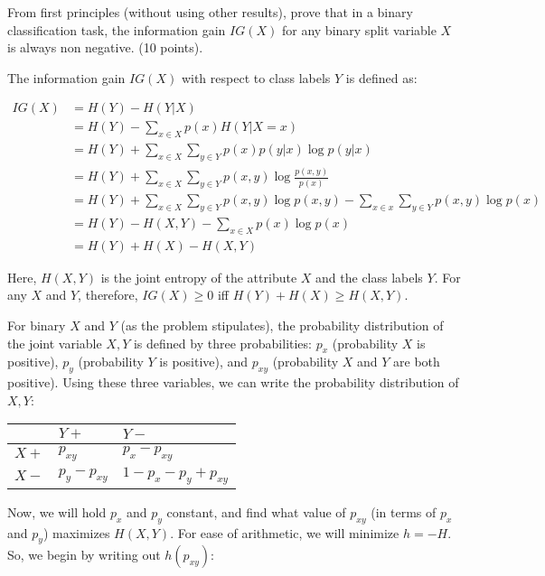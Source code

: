 \documentclass[fleqn]{homework}
\begin{document}
  \begin{problem}{3}
    \begin{question}
      From first principles (without using other results), prove that in a
      binary classification task, the information gain $IG(X)$ for any binary
      split variable $X$ is always non negative. (10 points).
    \end{question}

    The information gain $IG(X)$ with respect to class labels $Y$ is defined as:

    \begin{align*}
      IG(X) &= H(Y) - H(Y|X) \\
            &= H(Y) - \sum_{x \in X} p(x) H(Y|X=x) \\
            &= H(Y) + \sum_{x \in X} \sum_{y \in Y} p(x) p(y|x) \log p(y|x) \\
            &= H(Y) + \sum_{x \in X} \sum_{y \in Y} p(x, y) \log \frac{p(x,y)}{p(x)} \\
            &= H(Y) + \sum_{x \in X} \sum_{y \in Y} p(x, y) \log p(x,y) - \sum_{x \in x} \sum_{y \in Y} p(x,y) \log p(x) \\
            &= H(Y) - H(X,Y) - \sum_{x \in X} p(x) \log p(x) \\
            &= H(Y) + H(X) - H(X,Y)
    \end{align*}

    Here, $H(X,Y)$ is the joint entropy of the attribute $X$ and the class
    labels $Y$.  For any $X$ and $Y$, therefore, $IG(X) \ge 0$ iff
    $H(Y) + H(X) \ge H(X,Y)$.

    For binary $X$ and $Y$ (as the problem stipulates), the probability
    distribution of the joint variable $X,Y$ is defined by three probabilities:
    $p_x$ (probability $X$ is positive), $p_y$ (probability $Y$ is positive),
    and $p_{xy}$ (probability $X$ and $Y$ are both positive).  Using these three
    variables, we can write the probability distribution of $X,Y$:

    \begin{tabular}{l|ll}
           & $Y+$     & $Y-$ \\
      \hline
      $X+$ & $p_{xy}$ & $p_x - p_{xy}$ \\
      $X-$ & $p_y - p_{xy}$ & $1 - p_x - p_y + p_{xy}$ \\
    \end{tabular}

    Now, we will hold $p_x$ and $p_y$ constant, and find what value of $p_{xy}$
    (in terms of $p_x$ and $p_y$) maximizes $H(X,Y)$.  For ease of arithmetic,
    we will minimize $h = -H$.  So, we begin by writing out $h(p_{xy})$:


\end{problem}
\end{document}
